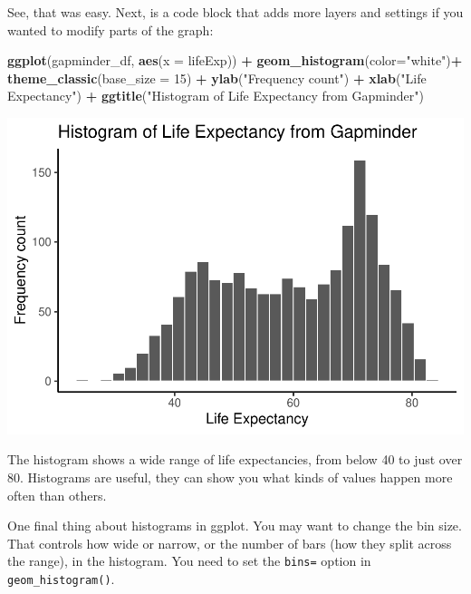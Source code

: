 \documentclass[
]{book}
\newenvironment{Shaded}{\begin{snugshade}}{\end{snugshade}}
\newcommand{\AttributeTok}[1]{\textcolor[rgb]{0.13,0.29,0.53}{#1}}
\newcommand{\DecValTok}[1]{\textcolor[rgb]{0.00,0.00,0.81}{#1}}
\newcommand{\FunctionTok}[1]{\textcolor[rgb]{0.13,0.29,0.53}{\textbf{#1}}}
\newcommand{\NormalTok}[1]{#1}
\newcommand{\SpecialCharTok}[1]{\textcolor[rgb]{0.81,0.36,0.00}{\textbf{#1}}}
\newcommand{\StringTok}[1]{\textcolor[rgb]{0.31,0.60,0.02}{#1}}
\begin{document}
See, that was easy. Next, is a code block that adds more layers and settings if you wanted to modify parts of the graph:

\begin{Shaded}
\begin{Highlighting}[]
\FunctionTok{ggplot}\NormalTok{(gapminder\_df, }\FunctionTok{aes}\NormalTok{(}\AttributeTok{x =}\NormalTok{ lifeExp)) }\SpecialCharTok{+}
  \FunctionTok{geom\_histogram}\NormalTok{(}\AttributeTok{color=}\StringTok{"white"}\NormalTok{)}\SpecialCharTok{+} 
  \FunctionTok{theme\_classic}\NormalTok{(}\AttributeTok{base\_size =} \DecValTok{15}\NormalTok{) }\SpecialCharTok{+}
  \FunctionTok{ylab}\NormalTok{(}\StringTok{"Frequency count"}\NormalTok{) }\SpecialCharTok{+} 
  \FunctionTok{xlab}\NormalTok{(}\StringTok{"Life Expectancy"}\NormalTok{) }\SpecialCharTok{+}
  \FunctionTok{ggtitle}\NormalTok{(}\StringTok{"Histogram of Life Expectancy from Gapminder"}\NormalTok{)}
\end{Highlighting}
\end{Shaded}

\includegraphics{Statistics_Lab_files/figure-latex/1gapminderB-1.pdf}

The histogram shows a wide range of life expectancies, from below 40 to just over 80. Histograms are useful, they can show you what kinds of values happen more often than others.

One final thing about histograms in ggplot. You may want to change the bin size. That controls how wide or narrow, or the number of bars (how they split across the range), in the histogram. You need to set the \texttt{bins=} option in \texttt{geom\_histogram()}.
\end{document}
